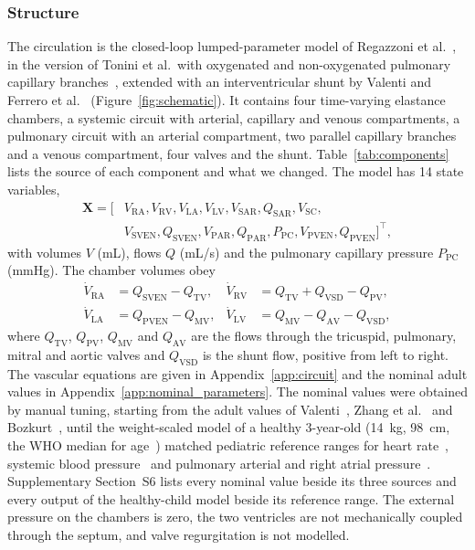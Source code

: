 \subsubsection{Structure}
The circulation is the closed-loop lumped-parameter model of Regazzoni et al.~\cite{Regazzoni2022}, in the version of Tonini et al.\ with oxygenated and non-oxygenated pulmonary capillary branches~\cite{Tonini2024,Tonini2025}, extended with an interventricular shunt by Valenti and Ferrero et al.~\cite{Valenti2023,Ferrero2026Shunts} (Figure~\ref{fig:schematic}). It contains four time-varying elastance chambers, a systemic circuit with arterial, capillary and venous compartments, a pulmonary circuit with an arterial compartment, two parallel capillary branches and a venous compartment, four valves and the shunt. Table~\ref{tab:components} lists the source of each component and what we changed. The model has 14 state variables,
\begin{equation}
\begin{split}\mathbf{X} = \big[ & V_{\mathrm{RA}}, V_{\mathrm{RV}}, V_{\mathrm{LA}}, V_{\mathrm{LV}}, V_{\mathrm{SAR}}, Q_{\mathrm{SAR}}, V_{\mathrm{SC}}, \\
  & V_{\mathrm{SVEN}}, Q_{\mathrm{SVEN}}, V_{\mathrm{PAR}}, Q_{\mathrm{PAR}}, P_{\mathrm{PC}}, V_{\mathrm{PVEN}}, Q_{\mathrm{PVEN}} \big]^{\top},\end{split}
\label{eq:state}
\end{equation}
with volumes $V$ (mL), flows $Q$ (mL/s) and the pulmonary capillary pressure $P_{\mathrm{PC}}$ (mmHg). The chamber volumes obey
\begin{equation}
\begin{aligned}
\dot{V}_{\mathrm{RA}} &= Q_{\mathrm{SVEN}} - Q_{\mathrm{TV}}, &
\dot{V}_{\mathrm{RV}} &= Q_{\mathrm{TV}} + Q_{\mathrm{VSD}} - Q_{\mathrm{PV}}, \\
\dot{V}_{\mathrm{LA}} &= Q_{\mathrm{PVEN}} - Q_{\mathrm{MV}}, &
\dot{V}_{\mathrm{LV}} &= Q_{\mathrm{MV}} - Q_{\mathrm{AV}} - Q_{\mathrm{VSD}},
\end{aligned}
\label{eq:chambers}
\end{equation}
where $Q_{\mathrm{TV}}$, $Q_{\mathrm{PV}}$, $Q_{\mathrm{MV}}$ and $Q_{\mathrm{AV}}$ are the flows through the tricuspid, pulmonary, mitral and aortic valves and $Q_{\mathrm{VSD}}$ is the shunt flow, positive from left to right. The vascular equations are given in Appendix~\ref{app:circuit} and the nominal adult values in Appendix~\ref{app:nominal_parameters}. The nominal values were obtained by manual tuning, starting from the adult values of Valenti~\cite{Valenti2023}, Zhang et al.~\cite{zhang2019multiscale} and Bozkurt~\cite{Bozkurt2019}, until the weight-scaled model of a healthy 3-year-old (14~kg, 98~cm, the WHO median for age~\cite{WHOgrowth}) matched pediatric reference ranges for heart rate~\cite{Joyce2025}, systemic blood pressure~\cite{Flynn2017} and pulmonary arterial and right atrial pressure~\cite{MalakanRad2024}. Supplementary Section~S6 lists every nominal value beside its three sources and every output of the healthy-child model beside its reference range. The external pressure on the chambers is zero, the two ventricles are not mechanically coupled through the septum, and valve regurgitation is not modelled.

